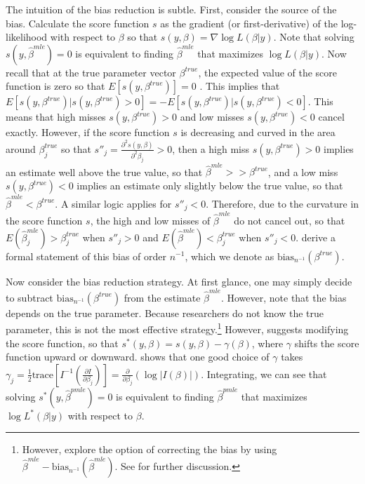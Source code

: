 \documentclass[12pt]{article}
\begin{document}
The intuition of the bias reduction is subtle. 
First, consider the source of the bias.
Calculate the score function $s$ as the gradient (or first-derivative) of the log-likelihood with respect to $\beta$ so that $s(y, \beta) = \nabla \log L(\beta | y)$. 
Note that solving $s(y, \hat{\beta}^{mle}) = 0$ is equivalent to finding $\hat{\beta}^{mle}$ that maximizes $\log L(\beta | y)$. 
Now recall that at the true parameter vector $\beta^{true}$, the expected value of the score function is zero so that $E\left[ s(y, \beta^{true})\right] = 0$ \citep[p. 517]{Greene2012}.
This implies that $E\left[ s(y, \beta^{true}) | s(y, \beta^{true}) > 0 \right] =  -E\left[ s(y, \beta^{true}) | s(y, \beta^{true}) < 0 \right]$. 
This means that high misses $s(y, \beta^{true}) > 0$ and low misses $s(y, \beta^{true}) < 0$ cancel exactly.
However, if the score function $s$ is decreasing and curved in the area around $\beta^{true}_j$ so that $s''_j = \frac{\partial^2 s(y, \beta)}{\partial^2 \beta_j} > 0$, then a high miss $s(y, \beta^{true}) > 0$ implies an estimate well above the true value, so that $\hat{\beta}^{mle} >> \beta^{true}$, and a low miss $s(y, \beta^{true}) < 0$ implies an estimate only slightly below the true value, so that $\hat{\beta}^{mle} < \beta^{true}$.
A similar logic applies for $s''_j < 0$. 
Therefore, due to the curvature in the score function $s$, the high and low misses of $\hat{\beta}^{mle}$ do not cancel out, so that $E(\hat{\beta}^{mle}_j) > \beta^{true}_j$ when $s''_j > 0$ and $E(\hat{\beta}^{mle}) < \beta^{true}_j$ when $s''_j < 0$.
\citet[pp. 251-252]{CoxSnell1968} derive a formal statement of this bias of order $n^{-1}$, which we denote as $\text{bias}_{n^{-1}}(\beta^{true})$. 

Now consider the bias reduction strategy. 
At first glance, one may simply decide to subtract $\text{bias}_{n^{-1}}(\beta^{true})$ from the estimate $\hat{\beta}^{mle}$. 
However, note that the bias depends on the true parameter. 
Because researchers do not know the true parameter, this is not the most effective strategy.\footnote{However, \cite{AndersonRichardson1979} explore the option of correcting the bias by using  $\hat{\beta}^{mle} - \text{bias}_{n^{-1}}(\hat{\beta}^{mle})$. See \citet[esp. p. 190]{Kosmidis2014} for further discussion.}
However, \cite{Firth1993} suggests modifying the score function, so that $s^*(y, \beta) = s(y, \beta) - \gamma(\beta)$, where $\gamma$ shifts the score function upward or downward.
\cite{Firth1993} shows that one good choice of $\gamma$ takes $\gamma_j = \frac{1}{2} \text{trace} \left[ I^{-1} \left( \frac{\partial I}{\partial \beta_j}\right)\right] = \frac{\partial}{\partial \beta_j} \left( \log | I(\beta) | \right)$.
Integrating, we can see that solving $s^*(y, \hat{\beta}^{pmle}) = 0$ is equivalent to finding $\hat{\beta}^{pmle}$ that maximizes $\log L^*(\beta | y)$ with respect to $\beta$.
\end{document}
